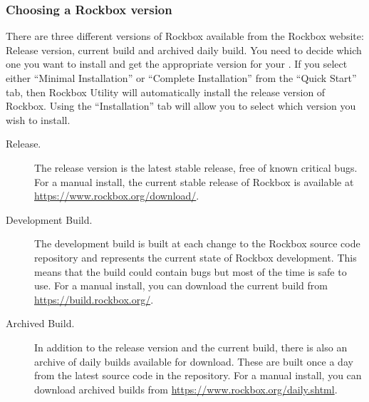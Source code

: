{
}
\subsubsection{Choosing a Rockbox version}\label{sec:choosing_version}

There are three different versions of Rockbox available from the
Rockbox website:
\label{Version}
Release version, current build and archived daily build. You need to decide which one
you want to install and get the appropriate version for your \dap{}. If you
select either ``Minimal Installation'' or ``Complete Installation'' from the
``Quick Start'' tab, then Rockbox Utility will automatically install the
release version of Rockbox. Using the ``Installation'' tab will allow you
to select which version you wish to install.


\begin{description}

\item[Release.] The release version is the latest stable release, free
   of known critical bugs. For a manual install, the current stable release of Rockbox is
   available at \url{https://www.rockbox.org/download/}.

\item[Development Build.] The development build is built at each change to
  the Rockbox source code repository and represents the current state of Rockbox
  development. This means that the build could contain bugs but most of
  the time is safe to use. For a manual install, you can download the current build from
  \url{https://build.rockbox.org/}.

\item[Archived Build.] In addition to the release version and the current build,
  there is also an archive of daily builds available for download. These are
  built once a day from the latest source code in the repository. For a manual install,
  you can download archived builds from \url{https://www.rockbox.org/daily.shtml}.

\end{description}

